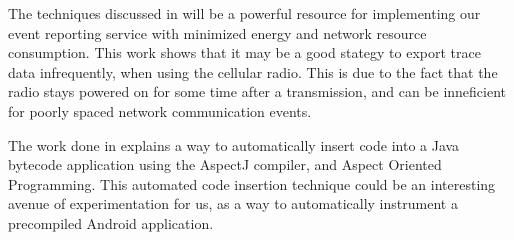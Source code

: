 The techniques discussed in \cite{PeriodicTransfers}
will be a powerful resource for implementing our event reporting service 
with minimized energy and network resource consumption. This work shows that
it may be a good stategy to export trace data infrequently, when using the 
cellular radio. This is due to the fact that the radio stays powered on for some 
time after a transmission, and can be inneficient for poorly spaced network communication events.

The work done in \cite{COCA} explains a way to automatically insert code
into a Java bytecode application using the AspectJ compiler, and 
Aspect Oriented Programming. This automated code insertion technique
could be an interesting avenue of experimentation for us, as a way to
automatically instrument a precompiled Android application.

